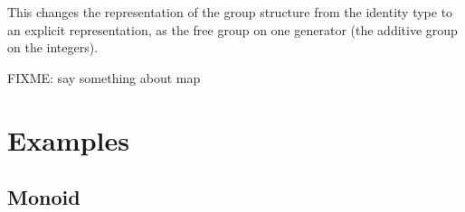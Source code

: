 This changes the representation of the group structure
from the identity type to an explicit representation, as the free group
on one generator (the additive group on the integers).  

FIXME: say something about map

\section{Examples}

\subsection{Monoid}


